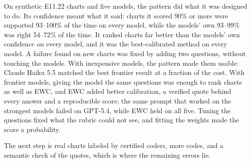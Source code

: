 \documentclass[10pt,letterpaper]{article}
\begin{document}
On synthetic E11.22 charts and five models, the pattern did what it was designed to do. Its confidence meant what it said: charts it scored 90\% or more were supported 93--100\% of the time on every model, while the models' own 93--99\% was right 54--72\% of the time. It ranked charts far better than the models' own confidence on every model, and it was the best-calibrated method on every model. A failure found on new charts was fixed by adding two questions, without touching the models. With inexpensive models, the pattern made them usable: Claude Haiku 5.5 matched the best frontier result at a fraction of the cost. With frontier models, giving the model the same questions was enough to rank charts as well as EWC, and EWC added better calibration, a verified quote behind every answer and a reproducible score; the same prompt that worked on the strongest models failed on GPT-5.4, while EWC held on all five. Tuning the questions fixed what the rubric could not see, and fitting the weights made the score a probability.

The next step is real charts labeled by certified coders, more codes, and a semantic check of the quotes, which is where the remaining errors lie.

\clearpage
\end{document}
